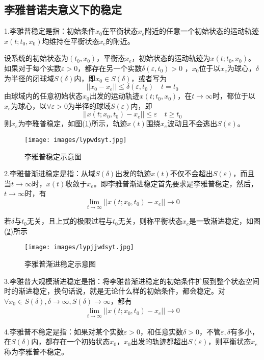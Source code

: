     \subsection{李雅普诺夫意义下的稳定}
        \par
        1.李雅普稳定是指：初始条件$x_0$在平衡状态$x_e$附近的任意一个初始状态的运动轨迹$x(t;t_0,x_0)$均维持在平衡状态$x_e$的附近。
        \par
        设系统的初始状态为$(t_0,x_0)$，平衡态$x_e$，初始状态的运动轨迹为$x(t;t_0,x_0)$。如果对于每个实数$\varepsilon>0$，都存在另一个实数$\delta (\varepsilon , t_0)>0$ ，$x_0$位于以$x_e$为球心，$\delta$为半径的闭球域$S(\delta)$内，即$x_0\in S(\delta)$，或者写为
        \[
            ||x_0-x_e||\leq \delta (\varepsilon,t_0)\quad t=t_0
        \]
        由球域内的任意初始状态$x_0$出发的运动轨迹$x(t;t_0,x_0)$，在$t\rightarrow\infty$时，都位于以$x_e$为球心，以$\forall \varepsilon >0$为半径的球域$S(\varepsilon)$内，即
        \[
            ||x(t;x_0,t_0)-x_e||\leq\varepsilon\quad t\geq t_0
        \]
        则$x_e$为李雅普稳定，如图(\ref{fig:李雅普稳定示意图})所示，轨迹$x(t)$围绕$x_e$波动且不会逃出$S(\varepsilon)$。
         \begin{figure}[H]
        \centering
        \texttt{[image: images/lypwdsyt.jpg]}
        \caption{李雅普稳定示意图}
        \label{fig:李雅普稳定示意图}
        \end{figure}
        \par
        2.李雅普渐进稳定是指：从域$S(\delta)$出发的轨迹$x(t)$不仅不会超出$S(\varepsilon)$，而且当$t\rightarrow\infty$时，$x(t)$收敛于$x_e$。即李雅普渐进稳定首先要求是李雅普稳定，然后，$t\rightarrow\infty$时，有
        \[
            \lim_{t\rightarrow\infty}||x(t;x_0,t_0)-x_e||\rightarrow 0
        \]
        \par
        若$\delta$与$t_0$无关，且上式的极限过程与$t_0$无关，则称平衡状态$x_e$是一致渐进稳定，如图(\ref{fig:李雅普渐进稳定示意图})所示
         \begin{figure}[H]
        \centering
        \texttt{[image: images/lypjjwdsyt.jpg]}
        \caption{李雅普渐进稳定示意图}
        \label{fig:李雅普渐进稳定示意图}
        \end{figure}
        \par
        3.李雅普大规模渐进稳定是指：将李雅普渐进稳定的初始条件扩展到整个状态空间时的渐进稳定，换句话说，就是无论什么样的初始条件，都会稳定。对$\forall x_0\in S(\delta),\delta\rightarrow\infty ,S(\delta)\rightarrow\infty$，都有
        \begin{align*}
        \lim_{t\rightarrow\infty}||x(t;x_0,t_0)-x_e||\rightarrow 0
        \end{align*}
        \par
        4.李雅普不稳定是指：如果对某个实数$\varepsilon>0$，和任意实数$\delta >0$，不管$\varepsilon, \delta$有多小，在$S(\delta)$内，都存在一个初始状态$x_0$，$x_0$出发的轨迹都超出$S(\varepsilon)$，则平衡状态$x_e$称为李雅普不稳定。
